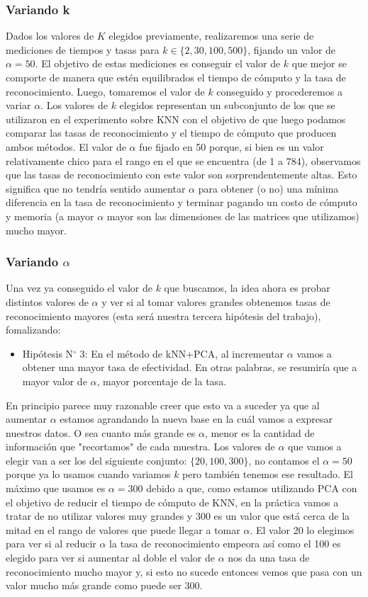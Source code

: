\subsubsection{Variando k}
Dados los valores de $K$ elegidos previamente, realizaremos una serie de mediciones de tiempos y tasas para $k \in \{2, 30, 100, 500\}$, fijando un valor de $\alpha = 50$. El objetivo de estas mediciones es conseguir el valor de $k$ que mejor se comporte de manera que estén equilibrados el tiempo de cómputo y la tasa de reconocimiento. Luego, tomaremos el valor de $k$ conseguido y procederemos a variar $\alpha$. Los valores de $k$ elegidos representan un subconjunto de los que se utilizaron en el experimento sobre KNN con el objetivo de que luego podamos comparar las tasas de reconocimiento y el tiempo de cómputo que producen ambos métodos. El valor de $\alpha$ fue fijado en 50 porque, si bien es un valor relativamente chico para el rango en el que se encuentra (de 1 a 784), observamos que las tasas de reconocimiento con este valor son sorprendentemente altas. Esto significa que no tendría sentido aumentar $\alpha$ para obtener (o no) una mínima diferencia en la tasa de reconocimiento y terminar pagando un costo de cómputo y memoria (a mayor $\alpha$ mayor son las dimensiones de las matrices que utilizamos) mucho mayor.
\subsubsection{Variando $\alpha$}
Una vez ya conseguido el valor de $k$ que buscamos, la idea ahora es probar distintos valores de $\alpha$ y ver si al tomar valores grandes obtenemos tasas de reconocimiento mayores (esta será nuestra tercera hipótesis del trabajo), fomalizando:
\begin{itemize}
\item Hipótesis N$ ^{\circ} $ 3: En el método de kNN+PCA, al incrementar $\alpha$ vamos a obtener una mayor tasa de efectividad. En otras palabras, se resumiría que a mayor valor de $\alpha$, mayor porcentaje de la tasa.
\end{itemize}


 En principio parece muy razonable creer que esto va a suceder ya que al aumentar $\alpha$ estamos agrandando la nueva base en la cuál vamos a expresar nuestros datos. O sea cuanto más grande es $\alpha$, menor es la cantidad de información que "recortamos" de cada muestra. Los valores de $\alpha$ que vamos a elegir van a ser los del siguiente conjunto: $\{20, 100, 300\}$, no contamos el $\alpha = 50$ porque ya lo usamos cuando variamos $k$ pero también tenemos ese resultado. El máximo que usamos es $\alpha = 300$ debido a que, como estamos utilizando PCA con el objetivo de reducir el tiempo de cómputo de KNN, en la práctica vamos a tratar de no utilizar valores muy grandes y 300 es un valor que está cerca de la mitad en el rango de valores que puede llegar a tomar $\alpha$. El valor 20 lo elegimos para ver si al reducir $\alpha$ la tasa de reconocimiento empeora así como el 100 es elegido para ver si aumentar al doble el valor de $\alpha$ nos da una tasa de reconocimiento mucho mayor y, si esto no sucede entonces vemos que pasa con un valor mucho más grande como puede ser 300.

